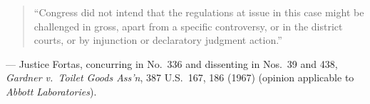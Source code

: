 \documentclass[12pt]{article}
\begin{document}
\begin{quote}
``Congress did not intend that the regulations at issue in this case might be challenged in gross, apart from a specific controversy, or in the district courts, or by injunction or declaratory judgment action.''
\end{quote}
\noindent --- Justice Fortas, concurring in No.\ 336 and dissenting in Nos.\ 39 and 438, \textit{Gardner v.\ Toilet Goods Ass'n}, 387 U.S.\ 167, 186 (1967) (opinion applicable to \textit{Abbott Laboratories}).
\end{document}

